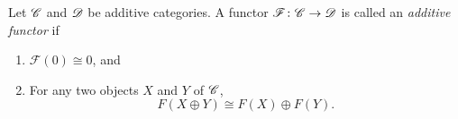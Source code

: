 \documentclass[dissertation.tex]{subfiles}
\begin{document}
\begin{defn}
  Let $\mathscr{C}$ and $\mathscr{D}$ be additive categories.
  A functor $\mathscr{F} \colon \mathscr{C} \rightarrow \mathscr{D}$ is called an {\it additive functor} if 
  \begin{enumerate}
  \item
    $\mathscr{F}(0) \cong 0$, and
  \item
    For any two objects $X$ and $Y$ of $\mathscr{C}$,
    $$F(X \oplus Y) \cong F(X) \oplus F(Y).$$
  \end{enumerate}
\end{defn}
\end{document}
